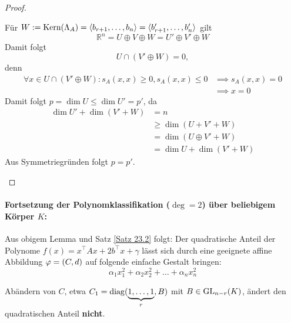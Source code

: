 \documentclass[parskip,a4paper,twoside,DIV15,BCOR12mm]{scrbook}
\begin{document}
\begin{proof}
\begin{enumerate}
Für \(W:=\operatorname{Kern}(\Lambda_{A})=\langle b_{r+1},\ldots,b_{n}\rangle =\langle b'_{r+1},\ldots,b'_{n}\rangle\) gilt
\[
\mathbb{R}^{n}=U\oplus V\oplus W=U'\oplus V'\oplus W
\]
Damit folgt
\[
U\cap(V'\oplus W)=0,
\]
denn 
\begin{align*}
\forall x\in U\cap(V'\oplus W): s_{A}(x,x)\geq 0,s_{A}(x,x)\leq 0&\implies
s_{A}(x,x)=0\\
&\implies x=0
\end{align*}
Damit folgt \(p=\dim U\leq\dim U'=p'\), da 
\begin{align*}
\dim U'+\dim(V'+W)&=n\\
&\geq\dim(U+V'+W)\\
&=\dim(U\oplus V'+W)\\
&=\dim U + \dim (V'+W)
\end{align*}
Aus Symmetriegründen folgt \(p=p'\).
\end{enumerate}
\end{proof}

\paragraph{Fortsetzung der Polynomklassifikation (\(\deg=2\)) über beliebigem
Körper \(K\):}{Aus obigem Lemma und Satz \ref{Satz 23.2} folgt: Der 
quadratische Anteil der Polynome \(f(x)=x^{\top}Ax+2b^{\top}x+\gamma\) 
lässt sich durch eine geeignete affine Abbildung \(\varphi=(C,d)\) auf folgende 
einfache Gestalt bringen:
\[
\alpha_{1}x_{1}^{2}+\alpha_{2}x_{2}^{2}+\ldots+\alpha_{n}x_{n}^{2}
\]
\begin{note}
Abändern von \(C\), etwa 
\(C_{1}=\operatorname{diag}(\underbrace{1,\ldots,1}_{r},B)\) mit \(B\in\operatorname{GL}_{n-r}(K)\),
ändert den quadratischen Anteil \textbf{nicht}.
\end{note}}
\end{document}
